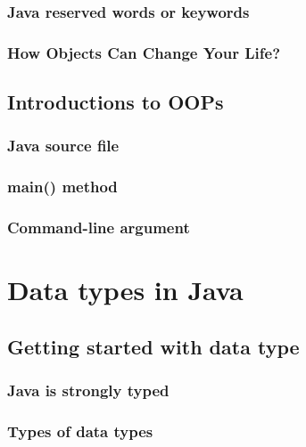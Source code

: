 \documentclass[14pt,fleqn]{extbook} %
\begin{document}
\subsection{Java reserved words or keywords}

\subsection{How Objects Can Change Your Life?}

\section{Introductions to OOPs}

\subsection{Java source file}
 
\subsection{main() method}
 
\subsection{Command-line argument}
 
%


\chapter{Data types in Java}
\section{Getting started with data type}
%
\subsection{Java is strongly typed}

\subsection{Types of data types}

\end{document}

